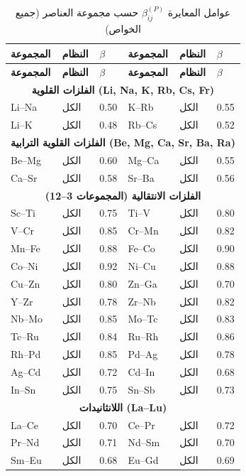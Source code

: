 \documentclass[12pt,a4paper]{article}
\begin{document}
	\begin{longtable}{p{2.5cm} p{2.5cm} p{1.2cm} p{2.5cm} p{2.5cm} p{1.2cm}}
		\caption{عوامل المعايرة \(\beta_{ij}^{(P)}\) حسب مجموعة العناصر (جميع الخواص)}\label{tab:beta_group}\\
		\toprule
		\textbf{المجموعة} & \textbf{النظام} & \(\beta\) & \textbf{المجموعة} & \textbf{النظام} & \(\beta\) \\
		\midrule
		\endfirsthead
		\toprule
		\textbf{المجموعة} & \textbf{النظام} & \(\beta\) & \textbf{المجموعة} & \textbf{النظام} & \(\beta\) \\
		\midrule
		\endhead
		\multicolumn{6}{c}{\textbf{الفلزات القلوية (Li, Na, K, Rb, Cs, Fr)}} \\
		Li–Na & الكل & 0.50 & K–Rb & الكل & 0.55 \\
		Li–K  & الكل & 0.48 & Rb–Cs & الكل & 0.52 \\
		\multicolumn{6}{c}{\textbf{الفلزات القلوية الترابية (Be, Mg, Ca, Sr, Ba, Ra)}} \\
		Be–Mg & الكل & 0.60 & Mg–Ca & الكل & 0.55 \\
		Ca–Sr & الكل & 0.58 & Sr–Ba & الكل & 0.56 \\
		\multicolumn{6}{c}{\textbf{الفلزات الانتقالية (المجموعات 3–12)}} \\
		Sc–Ti & الكل & 0.75 & Ti–V & الكل & 0.80 \\
		V–Cr  & الكل & 0.85 & Cr–Mn & الكل & 0.82 \\
		Mn–Fe & الكل & 0.88 & Fe–Co & الكل & 0.90 \\
		Co–Ni & الكل & 0.92 & Ni–Cu & الكل & 0.88 \\
		Cu–Zn & الكل & 0.80 & Zn–Ga & الكل & 0.70 \\
		Y–Zr  & الكل & 0.78 & Zr–Nb & الكل & 0.82 \\
		Nb–Mo & الكل & 0.85 & Mo–Tc & الكل & 0.83 \\
		Tc–Ru & الكل & 0.84 & Ru–Rh & الكل & 0.86 \\
		Rh–Pd & الكل & 0.85 & Pd–Ag & الكل & 0.78 \\
		Ag–Cd & الكل & 0.72 & Cd–In & الكل & 0.68 \\
		In–Sn & الكل & 0.75 & Sn–Sb & الكل & 0.73 \\
		\multicolumn{6}{c}{\textbf{اللانثانيدات (La–Lu)}} \\
		La–Ce & الكل & 0.70 & Ce–Pr & الكل & 0.72 \\
		Pr–Nd & الكل & 0.71 & Nd–Sm & الكل & 0.70 \\
		Sm–Eu & الكل & 0.68 & Eu–Gd & الكل & 0.69 \\

\end{longtable}
\end{document}
